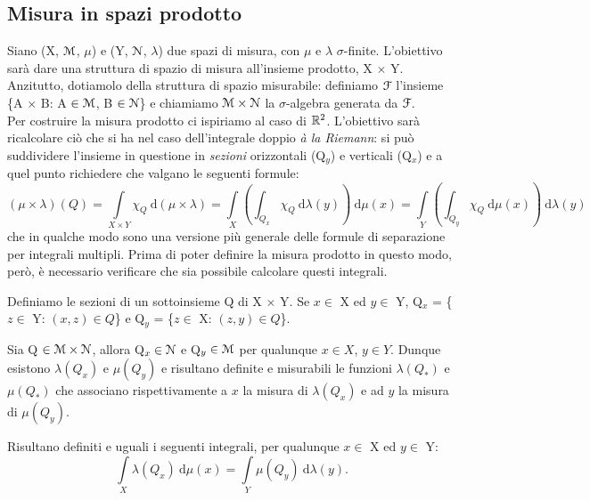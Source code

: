 \documentclass[Completo.tex]{subfiles}
\begin{document}
\subsection{Misura in spazi prodotto} Siano (X, $\eu[M]$, $\mu$) e (Y, $\eu[N]$, $\lambda$) due spazi di misura, con $\mu$ e $\lambda$ $\sigma$-finite. L'obiettivo sarà dare una struttura di spazio di misura all'insieme prodotto, X $\times$ Y. Anzitutto, dotiamolo della struttura di spazio misurabile: definiamo $\eu[F]$ l'insieme \{A $\times$ B: A $\in \eu[M]$, B $\in \eu[N]$\} e chiamiamo $\eu[M] \times \eu[N]$ la $\sigma$-algebra generata da $\eu[F]$. \\
Per costruire la misura prodotto ci ispiriamo al caso di $\bb[R]^2$. L'obiettivo sarà ricalcolare ciò che si ha nel caso dell'integrale doppio \textit{à la Riemann}: si può suddividere l'insieme in questione in \textit{sezioni} orizzontali (Q$_y$) e verticali (Q$_x$) e a quel punto richiedere che valgano le seguenti formule:
\begin{equation*}
(\mu \times \lambda)(Q) = \int\limits_{X \times Y} \chi_Q \ \mathrm{d}(\mu \times \lambda) = \int\limits_X \left(\int_{Q_x} \chi_Q \ \mathrm{d}\lambda(y)\right) \ \mathrm{d}\mu(x) = \int\limits_Y \left(\int_{Q_y} \chi_Q \ \mathrm{d}\mu(x)\right) \ \mathrm{d}\lambda(y) 
\end{equation*}
che in qualche modo sono una versione più generale delle formule di separazione per integrali multipli. Prima di poter definire la misura prodotto in questo modo, però, è necessario verificare che sia possibile calcolare questi integrali.
\begin{Def}
	Definiamo le sezioni di un sottoinsieme Q di X $\times$ Y. Se $x \in$ X ed $y \in$ Y, Q$_x$ = \{$z \in$ Y: $(x, z) \in Q$\} e Q$_y$ = \{$z \in$ X: $(z, y) \in Q$\}.
\end{Def}
\begin{Prop}
	Sia Q $\in \eu[M] \times \eu[N]$, allora Q$_x \in \eu[N]$ e Q$_y \in \eu[M]$ per qualunque $x \in X$, $y \in Y$. Dunque esistono $\lambda(Q_x)$ e $\mu(Q_y)$ e risultano definite e misurabili le funzioni $\lambda(Q_{*})$ e $\mu(Q_{*})$ che associano rispettivamente a $x$ la misura di $\lambda(Q_x)$ e ad $y$ la misura di $\mu(Q_y)$.
\end{Prop}
\begin{Th}
	Risultano definiti e uguali i seguenti integrali, per qualunque $x \in$ X ed $y \in$ Y:
	\begin{equation*}
	\int\limits_X \lambda(Q_x) \ \mathrm{d}\mu(x) = \int\limits_Y \mu(Q_y) \ \mathrm{d}\lambda(y).
	\end{equation*}
\end{Th}
\end{document}

